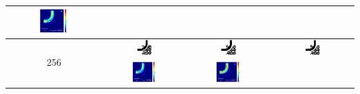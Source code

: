 \begin{table}[ht]
\begin{tabular}{|c|c|c|c|}
      \includegraphics[width=0.33\textwidth]{image/results/bend/L-BFGS-B/visualize_field_fab_128.png} \\
    \hline
      \multirow{2}{*}{256} &
      \includegraphics[width=0.20\textwidth]{image/results/bend/L-BFGS-B/visualize_eps_cont_256.png} &
      \includegraphics[width=0.20\textwidth]{image/results/bend/L-BFGS-B/visualize_eps_disc_256.png} &
      \includegraphics[width=0.20\textwidth]{image/results/bend/L-BFGS-B/visualize_eps_fab_256.png} \\
      \cline{2-4}
      &
      \includegraphics[width=0.33\textwidth]{image/results/bend/L-BFGS-B/visualize_field_cont_256.png} &
      \includegraphics[width=0.33\textwidth]{image/results/bend/L-BFGS-B/visualize_field_disc_256.png} &

\end{tabular}
\end{table}

